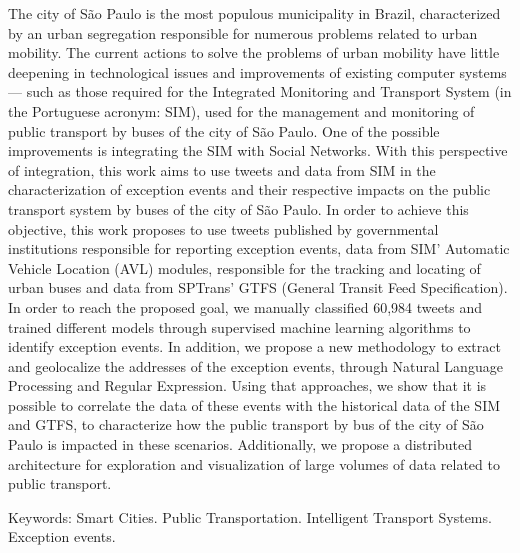 \documentclass[
	12pt,				%
	oneside,			%
	a4paper,			%
	english,			%
	brazil				%
	]{abntex2ppgsi}
\begin{document}
\begin{resumo}[Abstract]
The city of São Paulo is the most populous municipality in Brazil, characterized by an urban segregation responsible for numerous problems related to urban mobility. The current actions to solve the problems of urban mobility have little deepening in technological issues and improvements of existing computer systems --- such as those required for the Integrated Monitoring and Transport System (in the Portuguese acronym: SIM), used for the management and monitoring of public transport by buses of the city of São Paulo. One of the possible improvements is integrating the SIM with Social Networks. With this perspective of integration, this work aims to use tweets and data from SIM in the characterization of exception events and their respective impacts on the public transport system by buses of the city of São Paulo. In order to achieve this objective, this work proposes to use tweets published by governmental institutions responsible for reporting exception events, data from SIM' Automatic Vehicle Location (AVL) modules, responsible for the tracking and locating of urban buses and data from SPTrans' GTFS (General Transit Feed Specification). In order to reach the proposed goal, we manually classified 60,984 tweets and trained different models through supervised machine learning algorithms to identify exception events. In addition, we propose a new methodology to extract and geolocalize the addresses of the exception events, through Natural Language Processing and Regular Expression. Using that approaches, we show that it is possible to correlate the data of these events with the historical data of the SIM and GTFS, to characterize how the public transport by bus of the city of São Paulo is impacted in these scenarios. Additionally, we propose a distributed architecture for exploration and visualization of large volumes of data related to public transport.

Keywords: Smart Cities. Public Transportation. Intelligent Transport Systems. Exception events.
\end{resumo}

\listoffigures*
\cleardoublepage


\end{document}
